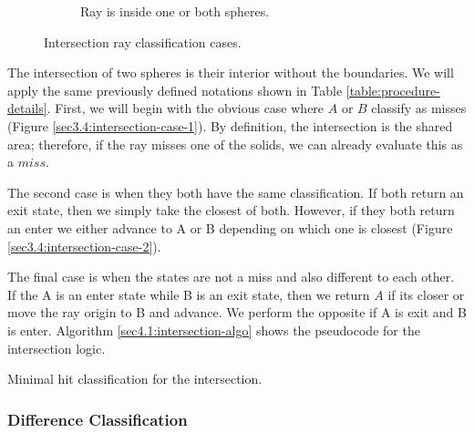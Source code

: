 \documentclass[a4paper,11pt,oneside]{article}
\begin{document}
\begin{figure}[ht]
\begin{subfigure}[b]{0.3\textwidth}
		\caption{Ray is inside one or both spheres.}
		\label{sec3.4:intersection-case-3}
	\end{subfigure}
	\caption{Intersection ray classification cases.}
	\label{sec3.4:sphere-intersection}
\end{figure}

The intersection of two spheres is their interior without the boundaries. We will apply the same previously defined notations shown in Table \ref{table:procedure-details}. First, we will begin with the obvious case where $A$ or $B$ classify as misses (Figure \ref{sec3.4:intersection-case-1}). By definition, the intersection is the shared area; therefore, if the ray misses one of the solids, we can already evaluate this as a $miss$.

The second case is when they both have the same classification. If both return an exit state, then we simply take the closest of both. However, if they both return an enter we either advance to A or B depending on which one is closest (Figure \ref{sec3.4:intersection-case-2}).

The final case is when the states are not a miss and also different to each other. If the A is an enter state while B is an exit state, then we return $A$ if its closer or move the ray origin to B and advance. We perform the opposite if A is exit and B is enter. Algorithm \ref{sec4.1:intersection-algo} shows the pseudocode for the intersection logic.

\begin{algorithm}
	\SetAlgoLined
	\caption{Minimal hit classification for the intersection.}
	\label{sec3.4:intersection_algo}
\end{algorithm}

\subsubsection{Difference Classification}
\label{section:minimal_difference_classficiation}
\end{document}

